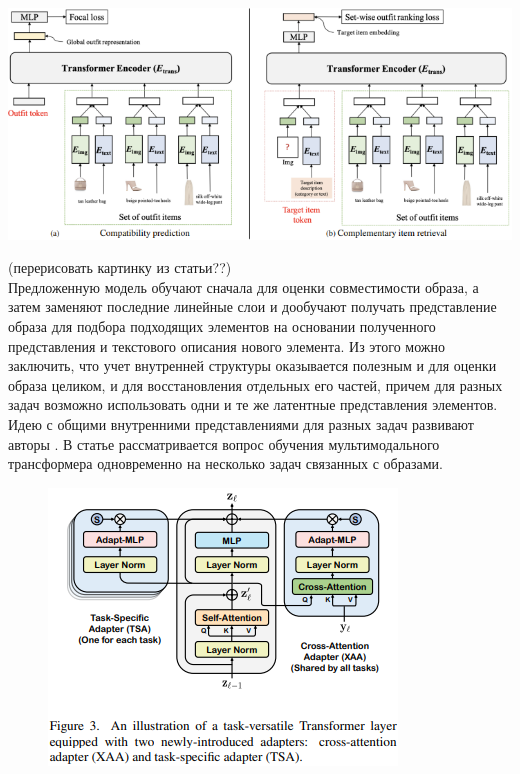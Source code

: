 \documentclass[a4paper,12pt]{article}
\begin{document}
				\includegraphics[scale = 0.8]{Literature review/OutfitTransfromer intro.png}
				
								
				(перерисовать картинку из статьи??)\\
				
				Предложенную модель обучают сначала для оценки совместимости образа, а затем заменяют последние линейные слои и дообучают получать представление образа для подбора подходящих элементов на основании полученного представления и текстового описания нового элемента. Из этого можно заключить, что учет внутренней структуры оказывается полезным и для оценки образа целиком, и для восстановления отдельных его частей, причем для разных задач возможно использовать одни и те же латентные представления элементов. \\
				
				Идею с общими внутренними представлениями для разных задач развивают авторы \cite{https://doi.org/10.48550/arXiv.2303.02483}. В статье рассматривается вопрос обучения мультимодального трансформера одновременно на несколько задач связанных с образами. 
				
				\begin{figure}
					\includegraphics[scale = 1.0]{Literature review/FAME-ViL_acrhitecture.png}
				\end{figure}
				
\end{document}
